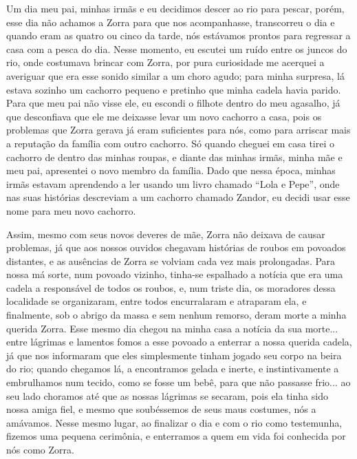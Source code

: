 Um dia meu pai, minhas irmãs e eu decidimos descer ao rio para pescar, porém, esse dia não achamos a Zorra para que nos acompanhasse, transcorreu o dia e quando eram as quatro ou cinco da tarde, nós estávamos prontos para regressar a casa com a pesca do dia. Nesse momento, eu escutei um ruído entre os juncos do rio, onde costumava brincar com Zorra, por pura curiosidade me acerquei a averiguar que era esse sonido similar a um choro agudo; para minha surpresa, lá estava sozinho um cachorro pequeno e pretinho que minha cadela havia parido.  
Para que meu pai não visse ele, eu escondi o filhote dentro do meu agasalho, já que desconfiava que ele me deixasse levar um novo cachorro a casa, pois os problemas que Zorra gerava já eram suficientes para nós, como para arriscar mais a reputação da família com outro cachorro.
Só quando cheguei em casa tirei o cachorro de dentro das minhas roupas, e diante das minhas irmãs, minha mãe e meu pai, apresentei o novo membro da família. Dado que nessa época, minhas irmãs estavam aprendendo a ler usando um livro chamado ``Lola e Pepe'', onde nas suas histórias descreviam a um cachorro chamado Zandor, eu decidi usar esse nome para meu novo cachorro. 

Assim, mesmo com seus novos deveres de mãe, Zorra não deixava de causar problemas, já que aos nossos ouvidos chegavam histórias de roubos em povoados distantes, e as ausências de Zorra se volviam cada vez mais prolongadas.
Para nossa má sorte, num povoado vizinho, tinha-se espalhado a notícia que era uma cadela a responsável de todos os roubos, e, num triste dia, os moradores dessa localidade se organizaram, entre todos encurralaram e atraparam ela, e finalmente, sob o abrigo da massa e sem nenhum remorso, deram morte a minha querida Zorra.
Esse mesmo dia chegou na minha casa a notícia da sua morte... entre lágrimas e lamentos fomos a esse povoado a enterrar a nossa querida cadela, já que nos informaram que eles simplesmente tinham jogado seu corpo na beira do rio; quando chegamos lá, a encontramos gelada e inerte, e instintivamente a embrulhamos num tecido, como se fosse um bebê, para que não passasse frio... ao seu lado choramos até que as nossas lágrimas se secaram, pois ela tinha sido nossa amiga fiel, e mesmo que soubéssemos de  seus maus costumes, nós a amávamos.
Nesse mesmo lugar, ao finalizar o dia e com o rio como testemunha, fizemos uma pequena cerimônia, e enterramos a quem em vida foi conhecida por nós como Zorra. 

